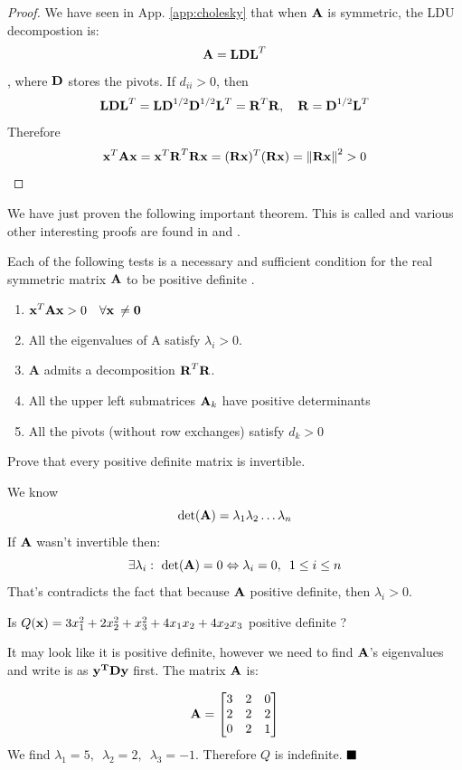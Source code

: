 \documentclass[a4paper]{article}
\numberwithin{equation}{section} %
\newcommand{\qedblack}{$\hfill\blacksquare$} %
\newcommand{\hquad}{\hskip0.5em\relax}%
\newcommand{\B}[1]{\textbf{\textup{#1}}} %
\newcommand{\emphasis}[1]{\textls{#1}}
\begin{document}
\begin{proof}
We have seen in App. \ref{app:cholesky} that when $\B{A}$ is symmetric, the LDU decompostion is:
\[
\B{A}=\B{LD}\B{L}^{T}
\]
, where $\B{D}$ stores the pivots. If $d_{ii}>0$, then
\[
\B{LD}\B{L}^{T}=\B{L}\B{D}^{1/2}\B{D}^{1/2}\B{L}^{T}=\B{R}^{T}\B{R}, \quad \B{R}=\B{D}^{1/2}\B{L}^{T}
\]
Therefore
\[
\B{x}^{T}\B{Ax}=\B{x}^{T}\B{R}^{T}\B{R}\B{x}=(\B{Rx})^{T}(\B{Rx})=\left\| \B{Rx} \right\|^{2}>0
\]
\end{proof} 

We have just proven the following important theorem. This is called \emphasis{Sylvester's theorem} and various other interesting proofs are found in \cite{article_csaki} and \cite{giorgi_definitiveness}.

\begin{shaded*}
\begin{theorem}
Each of the following tests is a necessary and sufficient condition for the real symmetric matrix $\B{A}$ to be positive definite \cite{chen_lec_notes}.
\begin{enumerate}
\item $\B{x}^{T}\B{Ax}>0 \quad \forall \B{x} \: \neq \B{0}$
\item All the eigenvalues of A satisfy $\lambda_i > 0$.
\item \B{A} admits a decomposition $\B{R}^{T}\B{R}$.
\item All the upper left submatrices $\B{A}_k$ have positive determinants
\item All the pivots (without row exchanges) satisfy $d_k > 0$
\end{enumerate}
\label{theorem:positive_def}
\end{theorem}
\end{shaded*}


\begin{exmp}
Prove that every positive definite matrix is invertible.
\end{exmp}
\begin{TheSolution}
We know
\[
\textup{det}(\B{A})=\lambda_{1}\lambda_{2}\ldots \lambda_n
\]
If $\B{A}$ wasn't invertible then:
\[
\exists \lambda_i:\ \textup{det}(\B{A})=0 \Leftrightarrow \lambda_i = 0, \hquad 1 \leq i \leq n
\]
That's contradicts the fact that because $\B{A}$ positive definite, then $\lambda_i>0$.
\end{TheSolution}

\begin{exmp}
Is $Q(\B{x})=3x_{1}^2+2x_{2}^2+x_{3}^2+4x_{1}x_{2}+4x_{2}x_{3}$ positive definite \cite{lay}?
\end{exmp}
\begin{TheSolution}
It may look like it is positive definite, however we need to find $\bf{A}$'s eigenvalues and write is as $\bf{y}^T\bf{Dy}$ first. The matrix $\bf{A}$ is:

	\[
    	\bf{A}=\begin{bmatrix}3 & 2 & 0\\ 2 & 2 & 2 \\ 0 & 2 & 1\end{bmatrix}
    \]
    We find $\lambda_{1} = 5, \enspace \lambda_{2} = 2, \enspace \lambda_{3} = -1$. Therefore $Q$ is indefinite.
\qedblack
\end{TheSolution}
\end{document}
